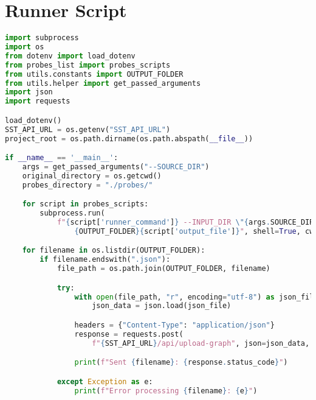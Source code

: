 \section{Runner Script}\label{appendix_sec:py_runner_script}
\begin{lstlisting}[language=Python]
import subprocess
import os
from dotenv import load_dotenv
from probes_list import probes_scripts
from utils.constants import OUTPUT_FOLDER
from utils.helper import get_passed_arguments
import json
import requests

load_dotenv()
SST_API_URL = os.getenv("SST_API_URL")
project_root = os.path.dirname(os.path.abspath(__file__))

if __name__ == '__main__':
    args = get_passed_arguments("--SOURCE_DIR")
    original_directory = os.getcwd()
    probes_directory = "./probes/"

    for script in probes_scripts:
        subprocess.run(
            f"{script['runner_command']} --INPUT_DIR \"{args.SOURCE_DIR}\" --OUTPUT \
                {OUTPUT_FOLDER}{script['output_file']}", shell=True, cwd=project_root)

    for filename in os.listdir(OUTPUT_FOLDER):
        if filename.endswith(".json"):
            file_path = os.path.join(OUTPUT_FOLDER, filename)

            try:
                with open(file_path, "r", encoding="utf-8") as json_file:
                    json_data = json.load(json_file)

                headers = {"Content-Type": "application/json"}
                response = requests.post(
                    f"{SST_API_URL}/api/upload-graph", json=json_data, headers=headers)

                print(f"Sent {filename}: {response.status_code}")

            except Exception as e:
                print(f"Error processing {filename}: {e}")
\end{lstlisting}

